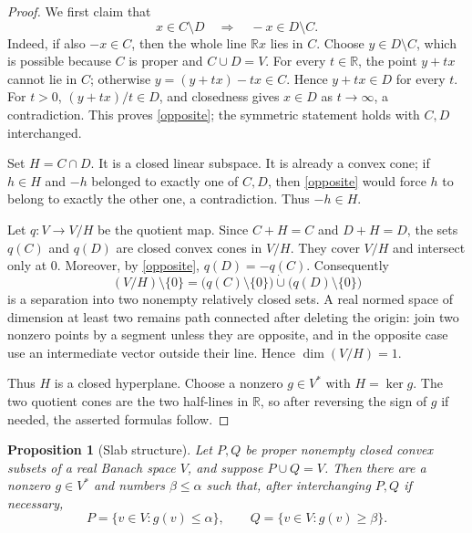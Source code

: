 \documentclass[11pt]{article}
\newtheorem{proposition}[theorem]{Proposition}
\theoremstyle{remark}
\newcommand{\R}{\mathbb{R}}
\begin{document}
\begin{proof}
We first claim that
\[
\tag{5.1}\label{opposite}
 x\in C\setminus D\quad\Longrightarrow\quad -x\in D\setminus C.
\]
Indeed, if also $-x\in C$, then the whole line $\R x$ lies in $C$.  Choose
$y\in D\setminus C$, which is possible because $C$ is proper and
$C\cup D=V$.  For every $t\in\R$, the point $y+tx$ cannot lie in $C$;
otherwise $y=(y+tx)-tx\in C$.  Hence $y+tx\in D$ for every $t$.  For
$t>0$, $(y+tx)/t\in D$, and closedness gives $x\in D$ as $t\to\infty$, a
contradiction.  This proves \eqref{opposite}; the symmetric statement holds
with $C,D$ interchanged.

Set $H=C\cap D$.  It is a closed linear subspace.  It is already a convex
cone; if $h\in H$ and $-h$ belonged to exactly one of $C,D$, then
\eqref{opposite} would force $h$ to belong to exactly the other one, a
contradiction.  Thus $-h\in H$.

Let $q:V\to V/H$ be the quotient map.  Since $C+H=C$ and $D+H=D$, the sets
$q(C)$ and $q(D)$ are closed convex cones in $V/H$.  They cover $V/H$ and
intersect only at $0$.  Moreover, by \eqref{opposite},
$q(D)=-q(C)$.  Consequently
\[
 (V/H)\setminus\{0\}
 =\bigl(q(C)\setminus\{0\}\bigr)
  \mathbin{\dot\cup}
  \bigl(q(D)\setminus\{0\}\bigr)
\]
is a separation into two nonempty relatively closed sets.  A real normed
space of dimension at least two remains path connected after deleting the
origin: join two nonzero points by a segment unless they are opposite, and
in the opposite case use an intermediate vector outside their line.  Hence
$\dim(V/H)=1$.

Thus $H$ is a closed hyperplane.  Choose a nonzero $g\in V^*$ with
$H=\ker g$.  The two quotient cones are the two half-lines in $\R$, so after
reversing the sign of $g$ if needed, the asserted formulas follow.
\end{proof}

\begin{proposition}[Slab structure]
\label{prop:slab}
Let $P,Q$ be proper nonempty closed convex subsets of a real Banach space
$V$, and suppose $P\cup Q=V$.  Then there are a nonzero $g\in V^*$ and
numbers $\beta\leq\alpha$ such that, after interchanging $P,Q$ if necessary,
\[
\tag{5.2}\label{slabs}
 P=\{v\in V:g(v)\leq\alpha\},
 \qquad
 Q=\{v\in V:g(v)\geq\beta\}.
\]
\end{proposition}
\end{document}
